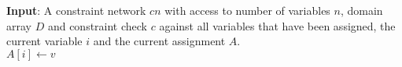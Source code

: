 \State \textbf{Input}: A constraint network $cn$ with access to number of variables $n$, domain array $D$ and constraint check $c$ against all variables that have been assigned, the current variable $i$ and the current assignment $A$.\\
        \State $A[i]\gets v$
            \State{}
        \EndIf
    \EndFor
    \State{}
\EndFunction